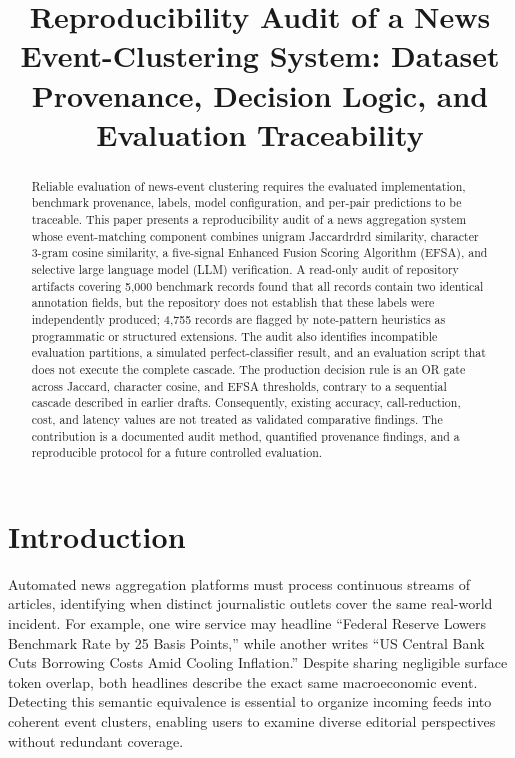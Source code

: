 \documentclass[sigconf,natbib=true,anonymous=true]{acmart}
\title{Reproducibility Audit of a News Event-Clustering System: Dataset Provenance, Decision Logic, and Evaluation Traceability}
\begin{document}
\begin{abstract}
Reliable evaluation of news-event clustering requires the evaluated implementation, benchmark provenance, labels, model configuration, and per-pair predictions to be traceable. This paper presents a reproducibility audit of a news aggregation system whose event-matching component combines unigram Jaccardrdrd similarity, character 3-gram cosine similarity, a five-signal Enhanced Fusion Scoring Algorithm (EFSA), and selective large language model (LLM) verification. A read-only audit of repository artifacts covering 5,000 benchmark records found that all records contain two identical annotation fields, but the repository does not establish that these labels were independently produced; 4,755 records are flagged by note-pattern heuristics as programmatic or structured extensions. The audit also identifies incompatible evaluation partitions, a simulated perfect-classifier result, and an evaluation script that does not execute the complete cascade. The production decision rule is an OR gate across Jaccard, character cosine, and EFSA thresholds, contrary to a sequential cascade described in earlier drafts. Consequently, existing accuracy, call-reduction, cost, and latency values are not treated as validated comparative findings. The contribution is a documented audit method, quantified provenance findings, and a reproducible protocol for a future controlled evaluation.
\end{abstract}
\maketitle

\section{Introduction}

Automated news aggregation platforms must process continuous streams of articles, identifying when distinct journalistic outlets cover the same real-world incident.
For example, one wire service may headline ``Federal Reserve Lowers Benchmark Rate by 25 Basis Points,'' while another writes ``US Central Bank Cuts Borrowing Costs Amid Cooling Inflation.''
Despite sharing negligible surface token overlap, both headlines describe the exact same macroeconomic event.
Detecting this semantic equivalence is essential to organize incoming feeds into coherent event clusters, enabling users to examine diverse editorial perspectives without redundant coverage.
\end{document}
